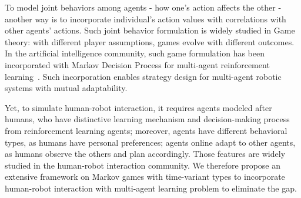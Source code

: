 \documentclass[letterpaper, 10 pt, conference]{ieeeconf}  %
\begin{document}


%



To model joint behaviors among agents - how one's action affects the other -  
another way is to incorporate individual's action values with correlations 
with other agents' actions. Such joint behavior formulation is widely studied 
in Game theory: with different player assumptions, games evolve with different 
outcomes. In the artificial intelligence community, such game 
formulation has been incorporated with Markov Decision Process for multi-agent 
reinforcement learning~\cite{littman1994markov}. Such incorporation enables strategy 
design for multi-agent robotic systems with mutual adaptability. 

Yet, to simulate human-robot interaction, it requires agents modeled after 
humans, who have distinctive learning mechanism and decision-making process 
from reinforcement learning agents; moreover, agents have different behavioral 
types, as humans have personal preferences; agents online adapt to other 
agents, as humans observe the others and plan accordingly. Those features are 
widely studied in the human-robot interaction community. We therefore propose 
an extensive framework on Markov games with time-variant types to incorporate 
human-robot interaction with multi-agent learning problem to eliminate the gap. 
\end{document}
